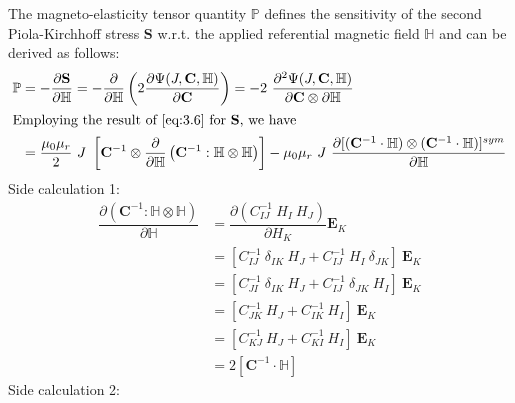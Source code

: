 The magneto-elasticity tensor quantity $\mathbb{P}$ defines the sensitivity of the second Piola-Kirchhoff stress $\mathbf{S}$ w.r.t. the applied referential magnetic field $\mathbb{H}$ and can be derived as follows:
\begin{align*}
\mathbb{P} &= -\dfrac{\partial \mathbf{S}}{\partial \mathbb{H}} = -\dfrac{\partial}{\partial \mathbb{H}} \left( 2 \dfrac{\partial \Psi (J, \mathbf{C}, \mathbb{H})}{\partial \mathbf{C}} \right) = -2 \ \dfrac{\partial^2 \Psi (J, \mathbf{C}, \mathbb{H})}{\partial \mathbf{C} \otimes \partial \mathbb{H}}\\
\intertext{Employing the result of \Cref{eq:3.6} for $\mathbf{S}$, we have}
&= \dfrac{\mu_0 \mu_r}{2} \ J \ \left[ \mathbf{C}^{-1} \otimes \dfrac{\partial}{\partial \mathbb{H}} \left( \mathbf{C}^{-1} : \mathbb{H} \otimes \mathbb{H} \right) \right] - \mu_0 \mu_r \ J \ \dfrac{\partial [ (\mathbf{C}^{-1} \cdot \mathbb{H}) \otimes (\mathbf{C}^{-1} \cdot \mathbb{H}) ]^{sym}}{\partial \mathbb{H}}
\end{align*}
Side calculation 1:
\begin{align*}
\dfrac{\partial \left( \mathbf{C}^{-1} : \mathbb{H} \otimes \mathbb{H} \right)}{\partial \mathbb{H}} &= \dfrac{\partial \left( C^{-1}_{IJ} \ H_I \ H_J \right)}{\partial H_K} \mathbf{E}_K \\
&= \left[ C^{-1}_{IJ} \ \delta_{IK} \ H_J + C^{-1}_{IJ} \ H_I \ \delta_{JK} \right] \ \mathbf{E}_K \\
&= \left[ C^{-1}_{JI} \ \delta_{IK} \ H_J + C^{-1}_{IJ} \ \delta_{JK} \ H_I \right] \ \mathbf{E}_K \\
&= \left[ C^{-1}_{JK} \ H_J + C^{-1}_{IK} \ H_I \right] \ \mathbf{E}_K \\
&= \left[ C^{-1}_{KJ} \ H_J + C^{-1}_{KI} \ H_I \right] \ \mathbf{E}_K \\
&= 2 [\mathbf{C}^{-1} \cdot \mathbb{H}]
\end{align*}
Side calculation 2:
